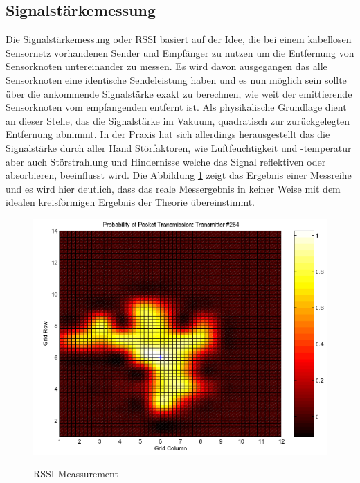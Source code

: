 \subsection{Signalstärkemessung}
Die Signalstärkemessung oder \ac{RSSI} basiert auf der Idee, die bei einem kabellosen Sensornetz vorhandenen Sender und Empfänger zu nutzen um die 
Entfernung von Sensorknoten untereinander zu messen. Es wird davon ausgegangen das alle Sensorknoten eine identische Sendeleistung haben und es nun
möglich sein sollte über die ankommende Signalstärke exakt zu berechnen, wie weit der emittierende Sensorknoten vom empfangenden entfernt ist. Als 
physikalische Grundlage dient an dieser Stelle, das die Signalstärke im Vakuum, quadratisch zur zurückgelegten Entfernung abnimmt. In der Praxis 
hat sich allerdings herausgestellt das die Signalstärke durch aller Hand Störfaktoren, wie Luftfeuchtigkeit und -temperatur aber auch Störstrahlung 
und Hindernisse welche das Signal reflektiven oder absorbieren, beeinflusst wird. Die Abbildung \ref{fig:RSSI} zeigt das Ergebnis einer Messreihe und es 
wird hier deutlich, dass das reale Messergebnis in keiner Weise mit dem idealen kreisförmigen Ergebnis der Theorie übereinstimmt. \cite{whitehouse}

\begin{figure}[h!]
  \centering
  \includegraphics[scale=0.75]{img/RSSI1}\\
  \label{fig:RSSI}
  \caption{RSSI Meassurement}
\end{figure}
\newpage
